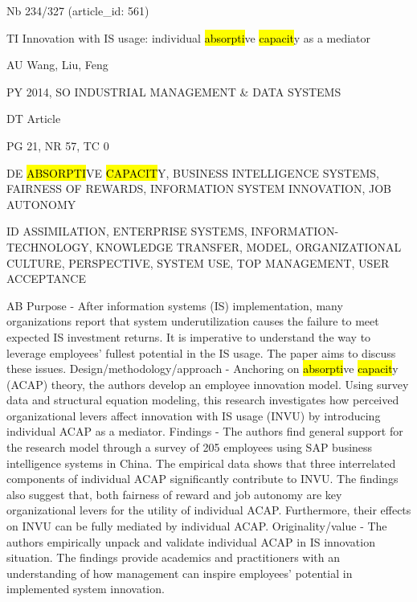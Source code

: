 \documentclass[a4paper]{article}
\begin{document}
\vspace*{-2cm}
Nb \tabto{0cm}234/327 (article\_id: 561)\par
TI \tabto{0cm}Innovation with IS usage: individual \hl{absorpti}ve \hl{capacit}y as a mediator\par
AU \tabto{0cm}Wang, Liu, Feng\par
PY \tabto{0cm}2014, SO INDUSTRIAL MANAGEMENT \& DATA SYSTEMS\par
DT \tabto{0cm}Article\par
PG \tabto{0cm}21, NR 57, TC 0\par
DE \tabto{0cm}\hl{ABSORPTI}VE \hl{CAPACIT}Y, BUSINESS INTELLIGENCE SYSTEMS, FAIRNESS OF REWARDS, INFORMATION SYSTEM INNOVATION, JOB AUTONOMY\par
ID \tabto{0cm}ASSIMILATION, ENTERPRISE SYSTEMS, INFORMATION-TECHNOLOGY, KNOWLEDGE TRANSFER, MODEL, ORGANIZATIONAL CULTURE, PERSPECTIVE, SYSTEM USE, TOP MANAGEMENT, USER ACCEPTANCE\par
AB \tabto{0cm}Purpose - After information systems (IS) implementation, many organizations report that system underutilization causes the failure to meet expected IS investment returns. It is imperative to understand the way to leverage employees' fullest potential in the IS usage. The paper aims to discuss these issues.
Design/methodology/approach - Anchoring on \hl{absorpti}ve \hl{capacit}y (ACAP) theory, the authors develop an employee innovation model. Using survey data and structural equation modeling, this research investigates how perceived organizational levers affect innovation with IS usage (INVU) by introducing individual ACAP as a mediator.
Findings - The authors find general support for the research model through a survey of 205 employees using SAP business intelligence systems in China. The empirical data shows that three interrelated components of individual ACAP significantly contribute to INVU. The findings also suggest that, both fairness of reward and job autonomy are key organizational levers for the utility of individual ACAP. Furthermore, their effects on INVU can be fully mediated by individual ACAP.
Originality/value - The authors empirically unpack and validate individual ACAP in IS innovation situation. The findings provide academics and practitioners with an understanding of how management can inspire employees' potential in implemented system innovation.\par
\clearpage
\end{document}
